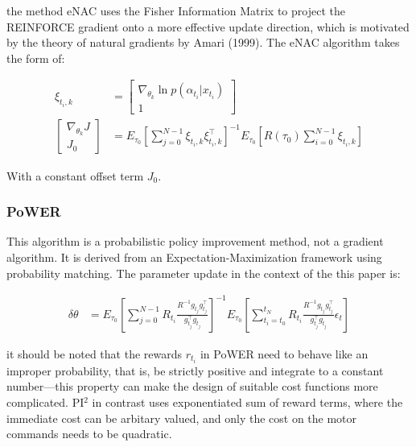 \documentclass[journal]{IEEEtran}
\begin{document}
the method eNAC uses the Fisher Information Matrix to project the REINFORCE gradient onto a more effective update direction, which is motivated by the theory of natural gradients by Amari (1999). 
The eNAC algorithm takes the form of:


\begin{equation}
  \begin{aligned}
   \xi_{t_i, k} & = \begin{bmatrix} \nabla_{\theta_k} \ln p(\alpha_{t_i}|x_{t_i}) \\ 1 \end{bmatrix} \\ 
   \begin{bmatrix}\nabla_{\theta_k} J \\ J_0\end{bmatrix} &= E_{\tau_0 }[\sum_{j = 0}^{N-1} \xi_{t_i, k}\xi_{t_i, k}^{\top}]^{-1} E_{\tau_0 }[R(\tau_0) \sum_{ i= 0}^{N-1}\xi_{t_i, k}]\nonumber 
  \end{aligned}
\end{equation}

With a constant offset term $J_0$.

\subsubsection{PoWER}

This algorithm is a probabilistic policy improvement method, not a gradient algorithm. It is derived from an Expectation-Maximization framework using probability matching.
The parameter update in the context of the this paper is:


\begin{equation}
  \begin{aligned}
   \delta \theta  &= E_{\tau_0 }[\sum_{j = 0}^{N-1} R_{t_i}\frac{R^{-1}g_{t_j}g_{t_j}^{\top}}{g_{t_j}^{\top}g_{t_j}}]^{-1} E_{\tau_0 }[ \sum_{ t_i= t_0}^{t_N}R_{t_i}\frac{R^{-1}g_{t_j}g_{t_j}^{\top}}{g_{t_j}^{\top}g_{t_j}}\epsilon_t]\nonumber 
  \end{aligned}
\end{equation}

it should be noted that the rewards $r_{t_i}$ in PoWER need to behave like an improper probability, that is, be strictly positive and integrate to a constant number—this property can make the design of suitable cost functions more complicated. 
PI$^2$ in contrast uses exponentiated sum of reward terms, where the immediate cost can be arbitary valued, and only the cost on the motor commands needs to be quadratic. 
\end{document}
